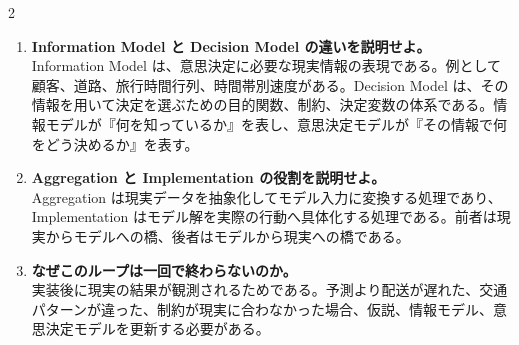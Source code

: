 \begin{multicols}{2}
\begin{enumerate}
\item \textbf{Information Model と Decision Model の違いを説明せよ。}\\
Information Model は、意思決定に必要な現実情報の表現である。例として顧客、道路、旅行時間行列、時間帯別速度がある。Decision Model は、その情報を用いて決定を選ぶための目的関数、制約、決定変数の体系である。情報モデルが『何を知っているか』を表し、意思決定モデルが『その情報で何をどう決めるか』を表す。
\item \textbf{Aggregation と Implementation の役割を説明せよ。}\\
Aggregation は現実データを抽象化してモデル入力に変換する処理であり、Implementation はモデル解を実際の行動へ具体化する処理である。前者は現実からモデルへの橋、後者はモデルから現実への橋である。
\item \textbf{なぜこのループは一回で終わらないのか。}\\
実装後に現実の結果が観測されるためである。予測より配送が遅れた、交通パターンが違った、制約が現実に合わなかった場合、仮説、情報モデル、意思決定モデルを更新する必要がある。
\end{enumerate}

\end{multicols}

\clearpage



\vspace{1.5mm}

